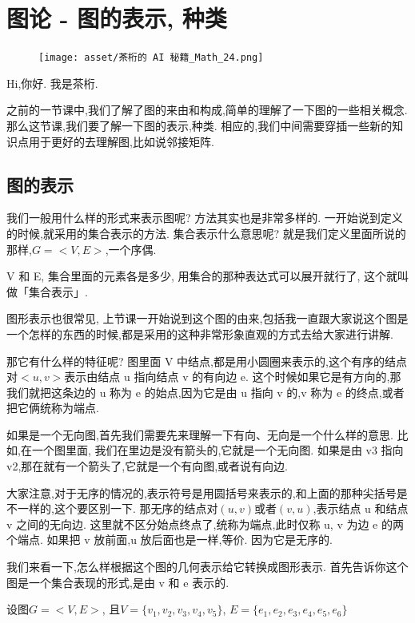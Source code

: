 \chapter{图论 - 图的表示, 种类}
\begin{figure}[ht]
  \centering
  \texttt{[image: asset/茶桁的 AI 秘籍\_Math\_24.png]}
\end{figure}

\newpage

Hi,你好. 我是茶桁. 

之前的一节课中,我们了解了图的来由和构成,简单的理解了一下图的一些相关概念. 那么这节课,我们要了解一下图的表示,种类. 相应的,我们中间需要穿插一些新的知识点用于更好的去理解图,比如说邻接矩阵. 

\section{图的表示}

我们一般用什么样的形式来表示图呢? 方法其实也是非常多样的. 一开始说到定义的时候,就采用的集合表示的方法. 集合表示什么意思呢? 就是我们定义里面所说的那样,$G = <V, E>$,一个序偶. 

V 和 E, 集合里面的元素各是多少, 用集合的那种表达式可以展开就行了, 这个就叫做「集合表示」. 

图形表示也很常见, 上节课一开始说到这个图的由来,包括我一直跟大家说这个图是一个怎样的东西的时候,都是采用的这种非常形象直观的方式去给大家进行讲解. 

那它有什么样的特征呢? 图里面 V 中结点,都是用小圆圈来表示的,这个有序的结点对$<u,v>$表示由结点 u 指向结点 v 的有向边 e. 这个时候如果它是有方向的,那我们就把这条边的 u 称为 e 的始点,因为它是由 u 指向 v 的,v 称为 e 的终点,或者把它俩统称为端点. 

如果是一个无向图,首先我们需要先来理解一下有向、无向是一个什么样的意思. 比如,在一个图里面,
我们在里边是没有箭头的,它就是一个无向图. 如果是由 v3 指向 v2,那在就有一个箭头了,它就是一个有向图,或者说有向边. 

大家注意,对于无序的情况的,表示符号是用圆括号来表示的,和上面的那种尖括号是不一样的,这个要区别一下. 那无序的结点对$(u,v)$或者$(v,u)$,表示结点 u 和结点 v 之间的无向边. 这里就不区分始点终点了,统称为端点,此时仅称 u, v 为边 e 的两个端点. 如果把 v 放前面,u 放后面也是一样,等价. 因为它是无序的. 

我们来看一下,怎么样根据这个图的几何表示给它转换成图形表示. 首先告诉你这个图是一个集合表现的形式,是由 v 和 e 表示的. 

设图$G=<V, E>$, 且$V = \{v_1,v_2,v_3,v_4,v_5\}$, $E = \{e_1,e_2,e_3,e_4,e_5,e_6\}$

